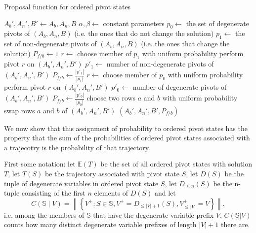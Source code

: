 \begin{algorithm}
\caption{Proposal function for ordered pivot states}
\label{proposal}
\begin{algorithmic}
 
\State $A_b',A_n',B' \leftarrow A_b,A_n,B$
\State $\alpha, \beta \leftarrow$ constant parameters
\State $p_0 \leftarrow$ the set of degenerate pivots of $(A_b,A_n,B)$ (i.e. the ones that do not change the solution)
\State $p_1 \leftarrow$ the set of non-degenerate pivots of $(A_b,A_n,B)$ (i.e. the ones that change the solution)
\State $P_{f/b} \leftarrow 1$ 
  \State $r \leftarrow$ choose member of $p_1$ with uniform probability
  \State perform pivot $r$ on $(A_b',A_n',B')$
  \State $p'_1 \leftarrow $ number of non-degenerate pivots of $(A_b',A_n',B')$
  \State $P_{f/b} \leftarrow \frac{|p'_1|}{|p_1|}$
  \State $r \leftarrow$ choose member of $p_0$ with uniform probability
  \State perform pivot $r$ on $(A_b',A_n',B')$
  \State $p'_0 \leftarrow $ number of degenerate pivots of $(A_b',A_n',B')$
  \State $P_{f/b} \leftarrow \frac{|p'_0|}{|p_0|}$
\Else
  \State choose two rows $a$ and $b$ with uniform probability
  \State swap rows $a$ and $b$ of $(A_b',A_n',B')$
\EndIf
\State \Return $(A_b',A_n',B',P_{f/b})$
\EndFunction
\end{algorithmic}
\end{algorithm}



We now show that this assignment of probability to ordered pivot states has the property that the sum of the probabilities of ordered pivot states associated with a trajecotry is the probability of that trajectory.

First some notation: let $\mathbb{E}(T)$ be the set of all ordered pivot states with solution $T$, let $T(S)$ be the trajectory associated with pivot state $S$, let $D(S)$ be the tuple of degenerate variables in ordered pivot state $S$, let $D_{\le n}(S)$ be the n-tuple consisting of the first $n$ elements of $D(S)$ and let
\begin{equation}
C(\mathbb{S} \mid V) = \left\|\left\{ V^+ :  S \in \mathbb{S}, V^+ = D_{\le |V|+1}(S), V^+_{\le |V|}=V \right\}\right\|,
\label{count}
\end{equation}
i.e. among the members of $\mathbb{S}$ that have the degenerate variable prefix $V$, $C(\mathbb{S}|V)$ counts how many distinct degenerate variable prefixes of length $|V|+1$ there are.




